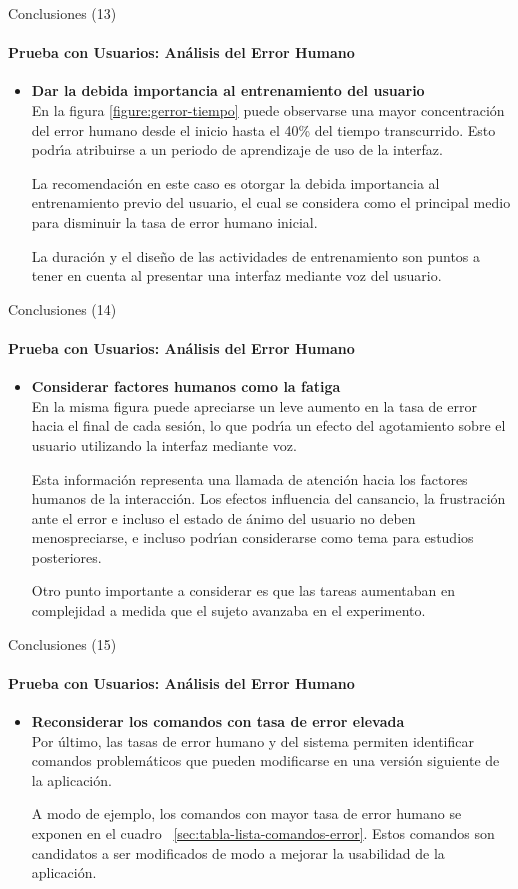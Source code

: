 \begin{frame}{Conclusiones (13)}
\framesubtitle{Prueba con Usuarios: An\'alisis del Error Humano}
\begin{itemize}
\item{\textbf{Dar la debida importancia al entrenamiento del usuario\\}}
En la figura \ref{figure:gerror-tiempo} puede observarse una mayor concentraci\'on del error humano
desde el inicio hasta el 40\% del tiempo transcurrido. Esto podr{{\'\i}}a atribuirse a un periodo de
aprendizaje de uso de la interfaz.

La recomendaci\'on en este caso es otorgar la debida importancia al entrenamiento previo del usuario,
el cual se considera como el principal medio para disminuir la tasa de error humano inicial.

La duraci\'on y el dise\~no de las actividades de entrenamiento son puntos a tener en cuenta
al presentar una interfaz mediante voz del usuario.

\end{itemize}
\end{frame}

\begin{frame}{Conclusiones (14)}
\framesubtitle{Prueba con Usuarios: An\'alisis del Error Humano}
\begin{itemize}
\item{\textbf{Considerar factores humanos como la fatiga\\}}
En la misma figura puede apreciarse un leve aumento en la tasa de error hacia el final de cada
sesi\'on, lo que podr{{\'\i}}a un efecto del agotamiento sobre el usuario utilizando la
interfaz mediante voz.


Esta informaci\'on representa una llamada de atenci\'on hacia los factores humanos de la interacci\'on.
Los efectos influencia del cansancio, la frustraci\'on ante el error e incluso el estado de \'animo
del usuario no deben menospreciarse, e incluso podr{\'\i}an considerarse como tema para estudios
posteriores. 

Otro punto importante a considerar es que las tareas aumentaban en complejidad a medida que
el sujeto avanzaba en el experimento.

\end{itemize}
\end{frame}

\begin{frame}{Conclusiones (15)}
\framesubtitle{Prueba con Usuarios: An\'alisis del Error Humano}
\begin{itemize}
\item{\textbf{Reconsiderar los comandos con tasa de error elevada\\}}
Por \'ultimo, las tasas de error humano y del sistema permiten identificar comandos 
problem\'aticos que pueden modificarse en una versi\'on siguiente de la aplicaci\'on.

A modo de ejemplo, los comandos con mayor tasa de error humano se exponen en el 
cuadro ~\ref{sec:tabla-lista-comandos-error}.
Estos comandos son candidatos a ser modificados de modo a mejorar la usabilidad de la
aplicaci\'on.
\end{itemize}
\end{frame}


